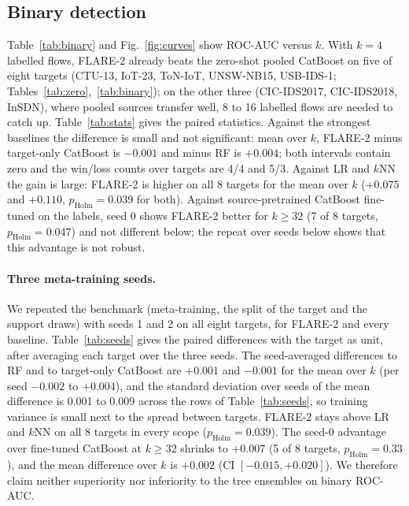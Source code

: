 \documentclass[11pt]{article}
\begin{document}
\subsection{Binary detection}
Table~\ref{tab:binary} and Fig.~\ref{fig:curves} show ROC-AUC versus $k$.
With $k=4$ labelled flows, FLARE-2 already beats the zero-shot pooled CatBoost on five of eight targets (CTU-13, IoT-23, ToN-IoT, UNSW-NB15, USB-IDS-1; Tables~\ref{tab:zero},~\ref{tab:binary}); on the other three (CIC-IDS2017, CIC-IDS2018, InSDN), where pooled sources transfer well, 8 to 16 labelled flows are needed to catch up.
Table~\ref{tab:stats} gives the paired statistics.
Against the strongest baselines the difference is small and not significant: mean over $k$, FLARE-2 minus target-only CatBoost is $-0.001$ and minus RF is $+0.004$; both intervals contain zero and the win/loss counts over targets are 4/4 and 5/3.
Against LR and $k$NN the gain is large: FLARE-2 is higher on all 8 targets for the mean over $k$ ($+0.075$ and $+0.110$, $p_{\text{Holm}}=0.039$ for both).
Against source-pretrained CatBoost fine-tuned on the labels, seed 0 shows FLARE-2 better for $k\ge 32$ (7 of 8 targets, $p_{\text{Holm}}=0.047$) and not different below; the repeat over seeds below shows that this advantage is not robust.

\paragraph{Three meta-training seeds.}
We repeated the benchmark (meta-training, the split of the target and the support draws) with seeds 1 and 2 on all eight targets, for FLARE-2 and every baseline.
Table~\ref{tab:seeds} gives the paired differences with the target as unit, after averaging each target over the three seeds.
The seed-averaged differences to RF and to target-only CatBoost are $+0.001$ and $-0.001$ for the mean over $k$ (per seed $-0.002$ to $+0.004$), and the standard deviation over seeds of the mean difference is 0.001 to 0.009 across the rows of Table~\ref{tab:seeds}, so training variance is small next to the spread between targets.
FLARE-2 stays above LR and $k$NN on all 8 targets in every scope ($p_{\text{Holm}}=0.039$).
The seed-0 advantage over fine-tuned CatBoost at $k\ge 32$ shrinks to $+0.007$ (5 of 8 targets, $p_{\text{Holm}}=0.33$), and the mean difference over $k$ is $+0.002$ (CI $[-0.015,+0.020]$).
We therefore claim neither superiority nor inferiority to the tree ensembles on binary ROC-AUC.

\begin{table}[t]
\centering\small
\caption{FLARE-2 minus baseline in binary ROC-AUC, mean over meta-training seeds 0--2, unit = target (8). W/L: targets where FLARE-2 is higher / lower. SD: standard deviation over seeds of the mean difference. $p_{\text{Holm}}$: exact Wilcoxon over targets, Holm-adjusted over the five baselines within each scope. Only the mean over $k$ is a primary endpoint.}\label{tab:seeds}
\resizebox{\linewidth}{!}{}
\end{table}
\end{document}
